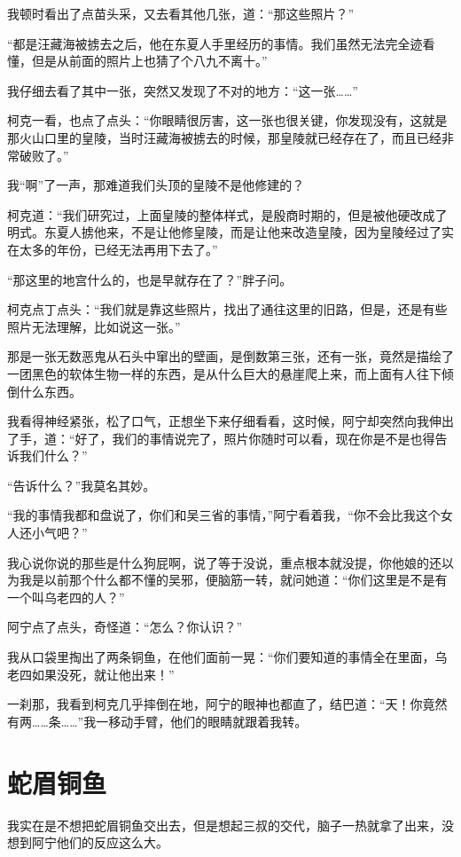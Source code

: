 我顿时看出了点苗头采，又去看其他几张，道：“那这些照片？”

“都是汪藏海被掳去之后，他在东夏人手里经历的事情。我们虽然无法完全迹看懂，但是从前面的照片上也猜了个八九不离十。”

我仔细去看了其中一张，突然又发现了不对的地方：“这一张……”

柯克一看，也点了点头：“你眼睛很厉害，这一张也很关键，你发现没有，这就是那火山口里的皇陵，当时汪藏海被掳去的时候，那皇陵就已经存在了，而且已经非常破败了。”

我“啊”了一声，那难道我们头顶的皇陵不是他修建的？

柯克道：“我们研究过，上面皇陵的整体样式，是殷商时期的，但是被他硬改成了明式。东夏人掳他来，不是让他修皇陵，而是让他来改造皇陵，因为皇陵经过了实在太多的年份，已经无法再用下去了。”

“那这里的地宫什么的，也是早就存在了？”胖子问。

柯克点丁点头：“我们就是靠这些照片，找出了通往这里的旧路，但是，还是有些照片无法理解，比如说这一张。”

那是一张无数恶鬼从石头中窜出的壁画，是倒数第三张，还有一张，竟然是描绘了一团黑色的软体生物一样的东西，是从什么巨大的悬崖爬上来，而上面有人往下倾倒什么东西。

我看得神经紧张，松了口气，正想坐下来仔细看看，这时候，阿宁却突然向我伸出了手，道：“好了，我们的事情说完了，照片你随时可以看，现在你是不是也得告诉我们什么？”

“告诉什么？”我莫名其妙。

“我的事情我都和盘说了，你们和吴三省的事情，”阿宁看着我，“你不会比我这个女人还小气吧？”

我心说你说的那些是什么狗屁啊，说了等于没说，重点根本就没提，你他娘的还以为我是以前那个什么都不懂的吴邪，便脑筋一转，就问她道：“你们这里是不是有一个叫乌老四的人？”

阿宁点了点头，奇怪道：“怎么？你认识？”

我从口袋里掏出了两条铜鱼，在他们面前一晃：“你们要知道的事情全在里面，乌老四如果没死，就让他出来！”

一刹那，我看到柯克几乎摔倒在地，阿宁的眼神也都直了，结巴道：“天！你竟然有两……条……”我一移动手臂，他们的眼睛就跟着我转。

\chapter{蛇眉铜鱼}

我实在是不想把蛇眉铜鱼交出去，但是想起三叔的交代，脑子一热就拿了出来，没想到阿宁他们的反应这么大。


